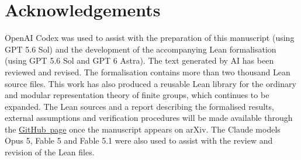 \documentclass[10pt]{amsart}
\theoremstyle{definition}
\numberwithin{equation}{section}
\numberwithin{table}{section}
\begin{document}
\section*{Acknowledgements}

OpenAI Codex was used to assist with the preparation of this manuscript
(using GPT 5.6 Sol) and the development of the accompanying Lean
formalisation (using GPT 5.6 Sol and GPT 6 Astra). The text generated by AI
has been reviewed and revised. The formalisation contains more than two
thousand Lean source files. This work has also produced a reusable Lean
library for the ordinary and modular representation theory of finite groups,
which continues to be expanded. The Lean sources and a report describing the
formalised results, external assumptions and verification procedures will
be made available through the
\href{https://github.com/BaoyuZhang747}{\textcolor{blue!60!black}{\mbox{GitHub page}}}
once the manuscript appears on arXiv. The Claude models Opus 5, Fable 5 and
Fable 5.1 were also used to assist with the review and revision of the
Lean files.
\end{document}
